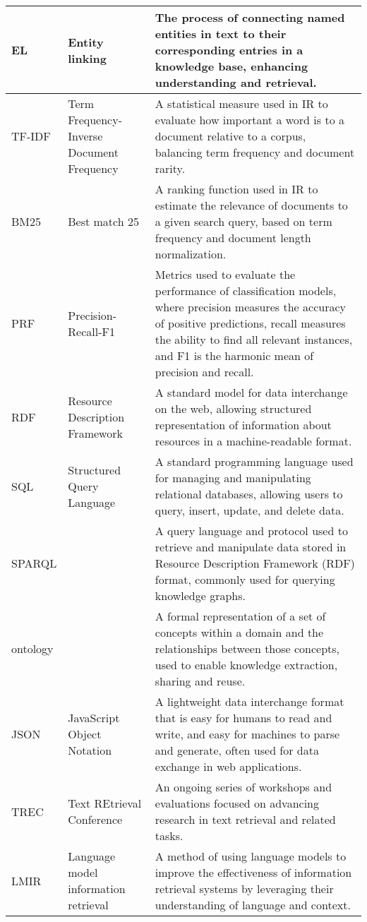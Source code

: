 \begin{tabularx}{\textwidth}{
  >{\raggedright\arraybackslash}p{2.5cm}
  >{\raggedright\arraybackslash}p{4cm}
  >{\noindent\justifying\arraybackslash}X
}
\cmidrule(lr){1-3}
EL    & Entity linking & The process of connecting named entities in text to their corresponding entries in a knowledge base, enhancing understanding and retrieval. \\
\cmidrule(lr){1-3}
TF-IDF & Term Frequency-Inverse Document Frequency & A statistical measure used in IR to evaluate how important a word is to a document relative to a corpus, balancing term frequency and document rarity. \\
\cmidrule(lr){1-3}
BM25  & Best match 25 & A ranking function used in IR to estimate the relevance of documents to a given search query, based on term frequency and document length normalization.\\
\cmidrule(lr){1-3}
PRF   & Precision-Recall-F1 & Metrics used to evaluate the performance of classification models, where precision measures the accuracy of positive predictions, recall measures the ability to find all relevant instances, and F1 is the harmonic mean of precision and recall. \\
\cmidrule(lr){1-3}
RDF   & Resource Description Framework & A standard model for data interchange on the web, allowing structured representation of information about resources in a machine-readable format. \\
\cmidrule(lr){1-3}
SQL   & Structured Query Language & A standard programming language used for managing and manipulating relational databases, allowing users to query, insert, update, and delete data. \\
\cmidrule(lr){1-3}
SPARQL &  & A query language and protocol used to retrieve and manipulate data stored in Resource Description Framework (RDF) format, commonly used for querying knowledge graphs. \\
\cmidrule(lr){1-3}  
ontology &  & A formal representation of a set of concepts within a domain and the relationships between those concepts, used to enable knowledge extraction, sharing and reuse. \\
\cmidrule(lr){1-3}
JSON  & JavaScript Object Notation & A lightweight data interchange format that is easy for humans to read and write, and easy for machines to parse and generate, often used for data exchange in web applications. \\
\cmidrule(lr){1-3}
TREC  & Text REtrieval Conference & An ongoing series of workshops and evaluations focused on advancing research in text retrieval and related tasks. \\
\cmidrule(lr){1-3}
LMIR & Language model information retrieval & A method of using language models to improve the effectiveness of information retrieval systems by leveraging their understanding of language and context. \\

\end{tabularx}
